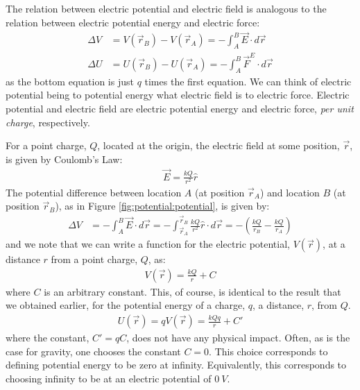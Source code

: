 The relation between electric potential and electric field is analogous to the relation between electric potential energy and electric force:
\begin{align*}
\Delta V &=V(\vec r_B)-V(\vec r_A)=-\int_A^B  \vec E\cdot d\vec r\\
\Delta U &=U(\vec r_B)-U(\vec r_A)=-\int_A^B  \vec F^E\cdot d\vec r
\end{align*}
as the bottom equation is just $q$ times the first equation. We can think of electric potential being to potential energy what electric field is to electric force. Electric potential and electric field are electric potential energy and electric force, \textit{per unit charge}, respectively.

For a point charge, $Q$, located at the origin, the electric field at some position, $\vec r$, is given by Coulomb's Law:
\begin{align*}
\vec E=\frac{kQ}{r^2}\hat r
\end{align*}
The potential difference between location $A$ (at position $\vec r_A$) and location $B$ (at position $\vec r_B$), as in Figure \ref{fig:potential:potential}, is given by:
\begin{align*}
\Delta V &=- \int_A^B  \vec E\cdot d\vec r= -\int_{\vec r_A}^{\vec r_B}  \frac{kQ}{r^2}\hat r\cdot d\vec r=-\left(\frac{kQ}{r_B}-\frac{kQ}{r_A}\right)
\end{align*}
and we note that we can write a function for the electric potential, $V(\vec r)$, at a distance $r$ from a point charge, $Q$, as:
\begin{align*}
V(\vec r)=\frac{kQ}{r}+C
\end{align*}
where $C$ is an arbitrary constant. This, of course, is identical to the result that we obtained earlier, for the potential energy of a charge, $q$, a distance, $r$, from $Q$. 
\begin{align*}
U(\vec r)=qV(\vec r)=\frac{kQq}{r}+C'
\end{align*}
where the constant, $C'=qC$, does not have any physical impact. Often, as is the case for gravity, one chooses the constant $C=0$. This choice corresponds to defining potential energy to be zero at infinity. Equivalently, this corresponds to choosing infinity to be at an electric potential of $\SI{0}{V}$.

